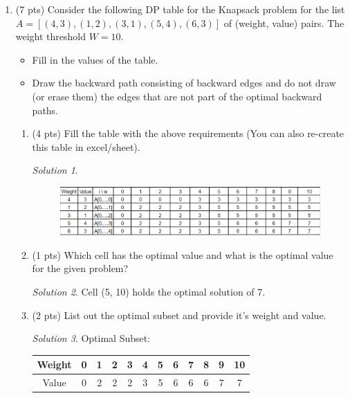 \documentclass[12pt]{article}
\theoremstyle{remark}
\newtheorem*{solution}{Solution}
\begin{document}
\begin{enumerate}

\item (7 pts) Consider the following DP table for the Knapsack problem for the list $A = [(4, 3), (1, 2), (3, 1), (5, 4), (6, 3)] $ of (weight, value) pairs. The weight threshold $W = 10$.
\begin{itemize}
    \item Fill in the values of the table.
    \item Draw the backward path consisting of backward edges and do not draw (or erase them) the edges that are not part of the optimal backward paths.
\end{itemize}

\begin{enumerate}
    \item (4 pts) Fill the table with the above requirements (You can also re-create this table in excel/sheet).
    \begin{solution}

    \end{solution}


\begin{figure}[h!]
\begin{center}
\includegraphics[scale=0.85]{PS9a_Q1.png}
\end{center}
\end{figure}
    \item (1 pts) Which cell has the optimal value and what is the optimal value for the given problem?
    \begin{solution}
Cell (5, 10) holds the optimal solution of 7.
    \end{solution}
    
    \item (2 pts) List out the optimal subset and provide it's weight and value.
    \begin{solution} Optimal Subset: \\
\begin{center}
\begin{tabular}{ |c|c|c|c|c|c|c|c|c|c|c|c| } 
 \hline
Weight & 0 & 1 & 2 & 3 & 4 & 5 & 6 & 7 & 8 & 9 & 10 \\
\hline
Value & 0 & 2 & 2 & 2 & 3 & 5 & 6 & 6 & 6 & 7 & 7 \\
 \hline
\end{tabular}
\end{center}
    \end{solution}


\end{enumerate}
\end{enumerate}
\end{document}
